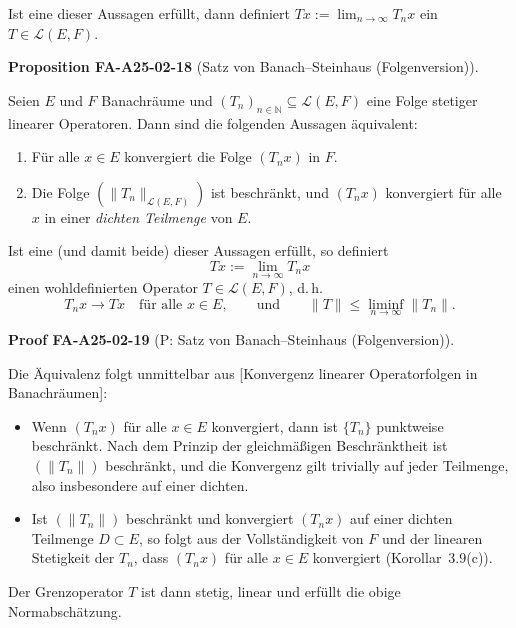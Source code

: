 \documentclass[10pt, letterpaper]{article}
\newcommand{\CustomHeading}[3]{%
  \par\medskip\noindent%
  \textbf{#1 #2} \textnormal{(#3)}.\enskip%
}
\newenvironment{PROP}[2]{\begin{unitbox}\CustomHeading{Proposition}{#1}{#2}}{\end{unitbox}}
\newenvironment{PROOF}[2]{\begin{unitbox}\CustomHeading{Proof}{#1}{#2}}{\end{unitbox}}
\begin{document}
Ist eine dieser Aussagen erfüllt, dann definiert $T x:=\lim _{n \rightarrow \infty} T_{n} x$ ein $T \in \mathcal{L}(E, F)$.



\begin{PROP}{FA-A25-02-18}{Satz von Banach--Steinhaus (Folgenversion)}
Seien $E$ und $F$ Banachräume und $\left(T_n\right)_{n\in\mathbb{N}}\subseteq\mathcal{L}(E,F)$ eine Folge stetiger linearer Operatoren. Dann sind die folgenden Aussagen äquivalent:

\begin{enumerate}[label=(\roman*)]
\item
Für alle $x\in E$ konvergiert die Folge $(T_nx)$ in $F$.
\item
Die Folge $(\|T_n\|_{\mathcal{L}(E,F)})$ ist beschränkt, und $(T_nx)$ konvergiert für alle $x$ in einer \emph{dichten Teilmenge} von $E$.
\end{enumerate}

Ist eine (und damit beide) dieser Aussagen erfüllt, so definiert
\[
Tx:=\lim_{n\to\infty}T_nx
\]
einen wohldefinierten Operator $T\in\mathcal{L}(E,F)$, d.\,h.
\[
T_nx\longrightarrow Tx\quad\text{für alle }x\in E,
\qquad\text{und}\qquad
\|T\|\le\liminf_{n\to\infty}\|T_n\|.
\]
\end{PROP}



\begin{PROOF}{FA-A25-02-19}{P: Satz von Banach--Steinhaus (Folgenversion)}
Die Äquivalenz folgt unmittelbar aus [Konvergenz linearer Operatorfolgen in Banachräumen]:

\begin{itemize}
\item[(i)$\Rightarrow$(ii)] 
Wenn $(T_nx)$ für alle $x\in E$ konvergiert, dann ist $\{T_n\}$ punktweise beschränkt. Nach dem Prinzip der gleichmäßigen Beschränktheit ist $(\|T_n\|)$ beschränkt, und die Konvergenz gilt trivially auf jeder Teilmenge, also insbesondere auf einer dichten.

\item[(ii)$\Rightarrow$(i)]
Ist $(\|T_n\|)$ beschränkt und konvergiert $(T_nx)$ auf einer dichten Teilmenge $D\subset E$, so folgt aus der Vollständigkeit von $F$ und der linearen Stetigkeit der $T_n$, dass $(T_nx)$ für alle $x\in E$ konvergiert (Korollar~3.9(c)).

\end{itemize}
Der Grenzoperator $T$ ist dann stetig, linear und erfüllt die obige Normabschätzung.
\end{PROOF}
\end{document}

